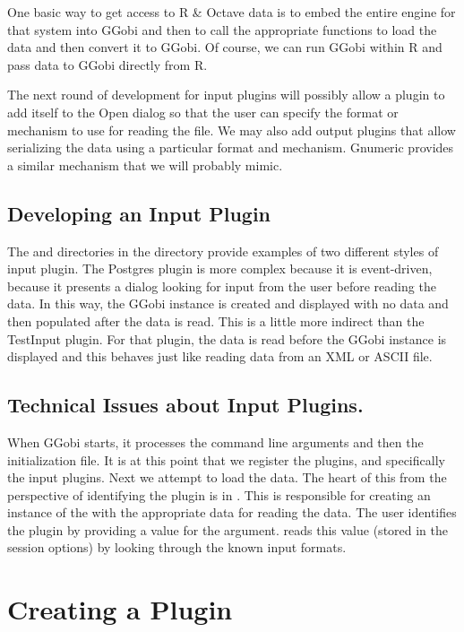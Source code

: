 \documentclass{article}
\def\file#1{\href{#1}{\Escape{#1}}}
\begin{document}
One basic way to get access to R \& Octave data is to embed the entire
engine for that system into GGobi and then to call the appropriate
functions to load the data and then convert it to GGobi.  Of course,
we can run GGobi within R and pass data to GGobi directly from R.


The next round of development for input plugins will possibly allow a
plugin to add itself to the Open dialog so that the user can specify
the format or mechanism to use for reading the file.  We may also add
output plugins that allow serializing the data using a particular
format and mechanism. Gnumeric provides a similar mechanism that we
will probably mimic.


\subsection{Developing an Input Plugin}

The  and  directories in the
 directory provide examples of two different styles of
input plugin. The Postgres plugin is more complex because it is
event-driven, because it presents a dialog looking for input from the
user before reading the data.  In this way, the GGobi instance is
created and displayed with no data and then populated after the data
is read. This is a little more indirect than the TestInput plugin.
For that plugin, the data is read before the GGobi instance is
displayed and this behaves just like reading data from an XML or ASCII
file.


\subsection{Technical Issues about Input Plugins.}
When GGobi starts, it processes the command line arguments and then the
initialization file.  It is at this point that we register the
plugins, and specifically the input plugins.  Next we attempt to load
the data.  The heart of this from the perspective of identifying the
plugin is  in \file{make_ggobi.c}.  This is
responsible for creating an instance of the 
with the appropriate data for reading the data.  The user identifies
the plugin by providing a value for the  argument.
 reads this value (stored in the session
options) by looking through the known input formats.



\section{Creating a Plugin}
\end{document}
